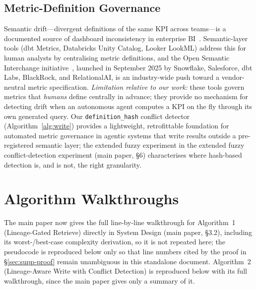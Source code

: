 \documentclass[9pt,twocolumn,twoside]{extarticle}
\begin{document}
\subsection{Metric-Definition Governance}

Semantic drift---divergent definitions of the same KPI across
teams---is a documented source of dashboard inconsistency in enterprise
BI~\cite{colrows2024metrics}.
Semantic-layer tools (dbt Metrics, Databricks Unity Catalog, Looker LookML)
address this for human analysts by centralising metric definitions, and the
Open Semantic Interchange initiative~\cite{snowflake2025osi}, launched in
September 2025 by Snowflake, Salesforce, dbt Labs, BlackRock, and
RelationalAI, is an industry-wide push toward a vendor-neutral metric
specification.
\emph{Limitation relative to our work:} these tools govern metrics that
\emph{humans} define centrally in advance; they provide no mechanism for
detecting drift when an autonomous agent computes a KPI on the fly through
its own generated query.
Our \texttt{definition\_hash} conflict detector (Algorithm~\ref{alg:write})
provides a lightweight, retrofittable foundation for automated metric
governance in agentic systems that write results outside a pre-registered
semantic layer; the extended fuzzy experiment in the extended fuzzy conflict-detection experiment (main paper, \S6)
characterises where hash-based detection is, and is not, the right
granularity.

\section{Algorithm Walkthroughs}
\label{sec:supp-algo}
The main paper now gives the full line-by-line walkthrough for Algorithm~1
(Lineage-Gated Retrieve) directly in System Design (main paper, \S3.2),
including its worst-/best-case complexity derivation, so it is not repeated
here; the pseudocode is reproduced below only so that line numbers cited by
the proof in \S\ref{sec:supp-proof} remain unambiguous in this standalone
document. Algorithm~2 (Lineage-Aware Write with Conflict Detection) is
reproduced below with its full walkthrough, since the main paper gives only
a summary of it.
\end{document}
